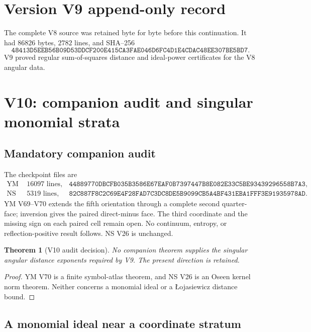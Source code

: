 \documentclass[11pt]{article}
\newtheorem{theorem}{Theorem}[section]
\theoremstyle{remark}
\begin{document}
\section*{Version V9 append-only record}
The complete V8 source was retained byte for byte before this
continuation.  It had \(86826\) bytes, \(2782\) lines, and SHA--256
\[
 \texttt{48413D5EEB56B09D53DDCF200E415CA3FAE046D6FC4D1E4CDAC48EE307BE5BD7}.
\]
V9 proved regular sum-of-squares distance and ideal-power
certificates for the V8 angular data.


\section{V10: companion audit and singular monomial strata}
\label{sec:v17v10}

\subsection{Mandatory companion audit}

The checkpoint files are
\[
\begin{array}{lll}
\text{YM V70:}&16097\text{ lines},&
\texttt{44889770DBCFB035B3586E67EAF0B7397447B8E082E33C5BE93439296558B7A3},\\
\text{NS V26:}&5319\text{ lines},&
\texttt{82C887F8C2C69E4F28FAD7C3DC8DE5B9099CB5A4BF431EBA1FFF3E91935978AD}.
\end{array}                                                    \tag{10.1}
\]
YM V69--V70 extends the fifth orientation through a complete second
quarter-face; inversion gives the paired direct-minus face.  The
third coordinate and the missing sign on each paired cell remain
open.  No continuum, entropy, or reflection-positive result follows.
NS V26 is unchanged.

\begin{theorem}[V10 audit decision]
\label{thm:v17v10-audit}
No companion theorem supplies the singular angular distance
exponents required by V9.  The present direction is retained.
\end{theorem}

\begin{proof}
YM V70 is a finite symbol-atlas theorem, and NS V26 is an Oseen
kernel norm theorem.  Neither concerns a monomial ideal or a
Łojasiewicz distance bound.
\end{proof}

\subsection{A monomial ideal near a coordinate stratum}
\end{document}

